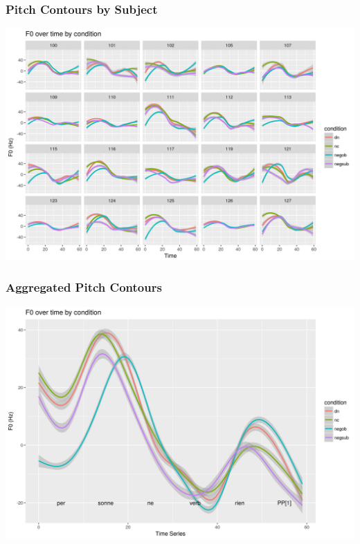 \documentclass{beamer}
\begin{document}
\begin{frame}
\frametitle{Pitch Contours by Subject}
\begin{center}
\includegraphics[width=\linewidth]{figures/overall_facet.jpeg}
\end{center}
\end{frame}

\begin{frame}
\frametitle{Aggregated Pitch Contours}
\begin{center}
\includegraphics[width=\linewidth]{figures/overall_pitch.jpeg}
\end{center}
\end{frame}
\end{document}
